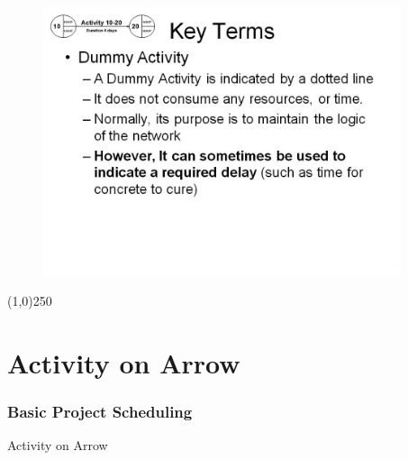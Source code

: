\begin{frame}
\begin{figure}
	\centering
		\includegraphics[width = 10.5cm]{oldnotes/Slide58.jpg}
\end{figure}
\end{frame}
\begin{center}\line(1,0){250}\end{center}









\section{Activity on Arrow}

\begin{frame}
	\frametitle{Basic Project Scheduling}
	\begin{block}{Activity on Arrow}		
	\end{block}
\end{frame}




